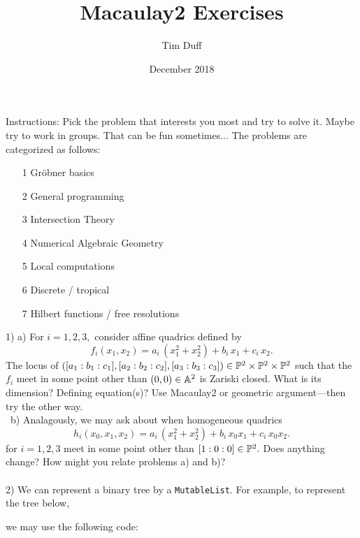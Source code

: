 \documentclass{article}
\title{Macaulay2 Exercises}
\author{Tim Duff}
\date{December 2018}
\begin{document}
\maketitle
$ $\\
Instructions: Pick the problem that interests you most and try to solve it. Maybe try to work in groups. That can be fun sometimes... The problems are categorized as follows:
\begin{itemize}
    \item[1] Gr\"{o}bner basics
    \item[2] General programming
    \item[3] Intersection Theory
    \item[4] Numerical Algebraic Geometry
    \item[5] Local computations
    \item[6] Discrete / tropical
    \item[7] Hilbert functions / free resolutions
\end{itemize}
1) a) For $i=1,2,3,$ consider affine quadrics defined by
\[
f_i (x_1,x_2) = a_i \, (x_1^2+x_2^2) + b_i \, x_1  + c_i \, x_2.
\]
The locus of $\left( [a_1:b_1:c_1], [a_2:b_2:c_2], [a_3: b_3: c_3] \right)\in \mathbb{P}^2 \times \mathbb{P}^2 \times \mathbb{P}^2$ such that the $f_i$ meet in some point other than $(0,0) \in \mathbb{A}^2$ is Zariski closed. What is its dimension? Defining equation(s)? Use Macaulay2 or geometric argument---then try the other way.\\\
b) Analagously, we may ask about when homogeneous quadrics
\[
h_i (x_0,x_1,x_2) = a_i \,  (x_1^2+x_2^2) + b_i\, x_0 x_1 + c_i\, x_0 x_2.
\]
for $i=1,2,3$ meet in some point other than $[1:0:0]\in \mathbb{P}^2.$ Does anything change? How might you relate problems a) and b)?\\\\
2) We can represent a binary tree by a \texttt{MutableList}. For example, to represent the tree below, 
\begin{center}
\end{center}
we may use the following code:
\end{document}
